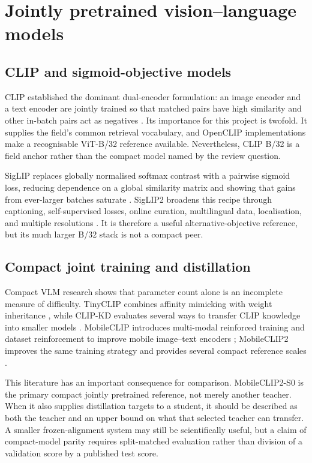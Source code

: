 \documentclass[11pt,a4paper]{article}
\begin{document}
\section{Jointly pretrained vision--language models}

\subsection{CLIP and sigmoid-objective models}

CLIP established the dominant dual-encoder formulation: an image encoder and a
text encoder are jointly trained so that matched pairs have high similarity and
other in-batch pairs act as negatives \cite{radford2021clip}. Its importance for
this project is twofold. It supplies the field's common retrieval vocabulary,
and OpenCLIP implementations make a recognisable ViT-B/32 reference available.
Nevertheless, CLIP B/32 is a field anchor rather than the compact model named by
the review question.

SigLIP replaces globally normalised softmax contrast with a pairwise sigmoid
loss, reducing dependence on a global similarity matrix and showing that gains
from ever-larger batches saturate \cite{zhai2023siglip}. SigLIP2 broadens this
recipe through captioning, self-supervised losses, online curation, multilingual
data, localisation, and multiple resolutions \cite{tschannen2025siglip2}. It is
therefore a useful alternative-objective reference, but its much larger B/32
stack is not a compact peer.

\subsection{Compact joint training and distillation}

Compact VLM research shows that parameter count alone is an incomplete measure
of difficulty. TinyCLIP combines affinity mimicking with weight inheritance
\cite{wu2023tinyclip}, while CLIP-KD evaluates several ways to transfer CLIP
knowledge into smaller models \cite{yang2024clipkd}. MobileCLIP introduces
multi-modal reinforced training and dataset reinforcement to improve mobile
image--text encoders \cite{vasu2024mobileclip}; MobileCLIP2 improves the same
training strategy and provides several compact reference scales
\cite{faghri2025mobileclip2}.

This literature has an important consequence for comparison. MobileCLIP2-S0 is
the primary compact jointly pretrained reference, not merely another teacher.
When it also supplies distillation targets to a student, it should be described
as both the teacher and an upper bound on what that selected teacher can
transfer. A smaller frozen-alignment system may still be scientifically useful,
but a claim of compact-model parity requires split-matched evaluation rather
than division of a validation score by a published test score.
\end{document}
